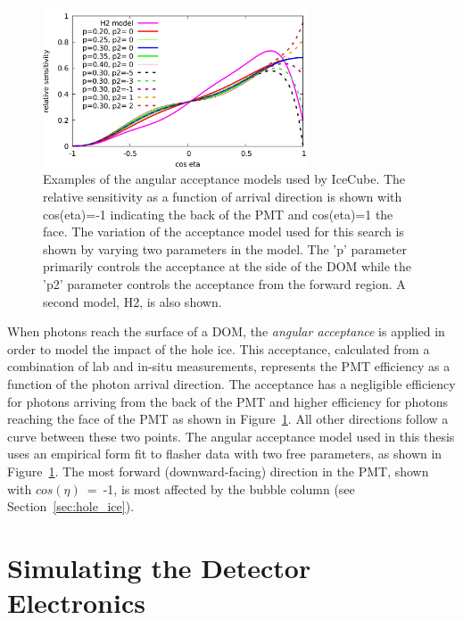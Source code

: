 \begin{figure}
\centering
\includegraphics[width=0.7\textwidth]{angular_acceptance.png} 
\caption[Angular acceptance models for IceCube hole ice]{Examples of the angular acceptance models used by IceCube. The relative sensitivity as a function of arrival direction is shown with cos(eta)=-1 indicating the back of the PMT and cos(eta)=1 the face. The variation of the acceptance model used for this search is shown by varying two parameters in the model. The 'p' parameter primarily controls the acceptance at the side of the DOM while the 'p2' parameter controls the acceptance from the forward region. A second model, H2, is also shown.}
\label{fig:angular_acceptance}
\end{figure}

When photons reach the surface of a DOM, the \emph{angular acceptance} is applied in order to model the impact of the hole ice.
This acceptance, calculated from a combination of lab and in-situ measurements, represents the PMT efficiency as a function of the photon arrival direction.
The acceptance has a negligible efficiency for photons arriving from the back of the PMT and higher efficiency for photons reaching the face of the PMT as shown in Figure~\ref{fig:angular_acceptance}.
All other directions follow a curve between these two points.
The angular acceptance model used in this thesis uses an empirical form fit to flasher data with two free parameters, as shown in Figure~\ref{fig:angular_acceptance}.
The most forward (downward-facing) direction in the PMT, shown with $cos(\eta)$~=~-1, is most affected by the bubble column (see Section~\ref{sec:hole_ice}). 














\section{Simulating the Detector Electronics}
\label{sec:electronics}

